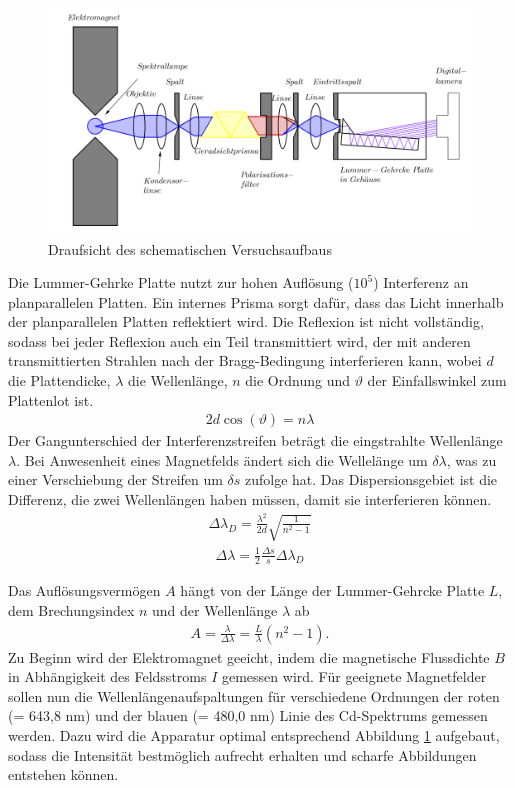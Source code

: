 \begin{figure}[H]
\includegraphics[width=1\textwidth]{../pics/aufbauZee.png}
\caption{Draufsicht des schematischen Versuchsaufbaus}
\label{pic_aufbauZee}
\end{figure}
Die Lummer-Gehrke Platte nutzt zur hohen Auflösung ($10^5$) Interferenz an planparallelen Platten. Ein internes Prisma sorgt dafür, dass das Licht
innerhalb der planparallelen Platten reflektiert wird. Die Reflexion ist nicht vollständig, sodass bei jeder Reflexion auch ein Teil transmittiert wird,
der mit anderen transmittierten Strahlen nach der Bragg-Bedingung interferieren kann, wobei $d$ die Plattendicke, $\lambda$ die Wellenlänge, $n$ die Ordnung und $\vartheta$
der Einfallswinkel zum Plattenlot ist.
\begin{align}
 2d\cos(\vartheta) = n\lambda
\end{align}
Der Gangunterschied der Interferenzstreifen beträgt die eingstrahlte Wellenlänge $\lambda$. Bei Anwesenheit eines Magnetfelds ändert sich die Wellelänge
um $\delta \lambda$, was zu einer Verschiebung der Streifen um $\delta s$ zufolge hat. Das Dispersionsgebiet ist die Differenz, die zwei Wellenlängen
haben müssen, damit sie interferieren können. 
\begin{align}
 \Delta \lambda_D = \frac{\lambda^2}{2d}\sqrt{\frac{1}{n^2-1}}
 \label{eq_lamdaD}
\end{align}
\begin{align}
 \Delta \lambda = \frac12 \frac{\Delta s}{s} \Delta \lambda_D
 \label{eq_lambda}
\end{align}

Das Auflösungsvermögen $A$ hängt von der Länge der Lummer-Gehrcke Platte $L$, dem Brechungsindex $n$ und der Wellenlänge $\lambda$ ab
\begin{align}
  A = \frac{\lambda}{\Delta \lambda}=\frac{L}{\lambda}(n^2-1).
\end{align}
Zu Beginn wird der Elektromagnet geeicht, indem die magnetische Flussdichte $B$ in Abhängigkeit des Feldsstroms $I$ gemessen wird. Für geeignete 
Magnetfelder sollen nun die Wellenlängenaufspaltungen für verschiedene Ordnungen der roten (= 643,8 nm) und der blauen (= 480,0 nm) Linie 
des Cd-Spektrums gemessen werden. Dazu wird die Apparatur optimal entsprechend Abbildung \ref{pic_aufbauZee} aufgebaut, sodass die Intensität
bestmöglich aufrecht erhalten und scharfe Abbildungen entstehen können.


